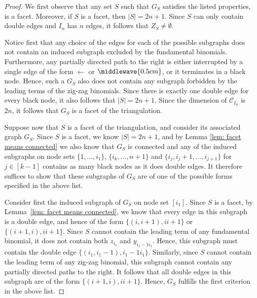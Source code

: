 \begin{proof}
We first observe that any set $S$ such that $G_S$ satisfies the listed properties, is a facet. Moreover, if $S$ is a facet, then $|S|=2n+1$. Since $S$ can only contain double edges and $I_n$ has $n$ edges, it follows that $Z_S\neq \emptyset$. 

Notice first that any choice of the edges for each of the possible subgraphs does not contain an induced subgraph excluded by the fundamental binomials. 
Furthermore, any partially directed path to the right is either interrupted by a single edge of the form $\leftarrow$ or $\middlewave{0.5cm}$, or it terminates in a black node. 
Hence, such a $G_S$ also does not contain any subgraph forbidden by the leading terms of the zig-zag binomials.
Since there is exactly one double edge for every black node, it also follows that $|S| = 2n+1$.  
Since the dimension of $\mathcal{C}_{I_{n}}$ is $2n$, it follows that $G_S$ is a facet of the triangulation. 

Suppose now that $S$ is a facet of the triangulation, and consider its associated graph $G_S$.  
Since $S$ is a facet, we know $|S| = 2n+1$, and by Lemma \ref{lem: facet means connected} we also know that $G_S$ is connected and any of the induced subgraphs on node sets $\{1,\ldots, i_1\}$, $\{i_k,\ldots, n+1\}$ and $\{i_j, i_j+1,\ldots, i_{j+1}\}$ for $j\in[k-1]$ contains as many black nodes as it does double edges.  It therefore suffices to show that these subgraphs of $G_S$ are of  one of the possible forms specified in the above list. 

Consider first the induced subgraph of $G_S$ on node set $[i_1]$. 
Since $S$ is a facet, by Lemma~\ref{lem: facet means connected}, we know that every edge in this subgraph is a double edge, and hence of the form $\{(i,i+1), ii+1\}$ or $\{(i+1,i), ii+1\}$.
Since $S$ cannot contain the leading term of any fundamental binomial, it does not contain both $z_{i_1}$ and $y_{i_1-1i_1}$.  
Hence, this subgraph must contain the double edge $\{(i_1,i_1-1), i_1-1i_1\}$.
Similarly, since $S$ cannot contain the leading term of any zig-zag binomial, this subgraph cannot contain any partially directed paths to the right.  
It follows that all double edges in this subgraph are of the form $\{(i+1,i), ii+1\}$.
Hence, $G_S$ fulfills the first criterion in the above list.


\end{proof}
